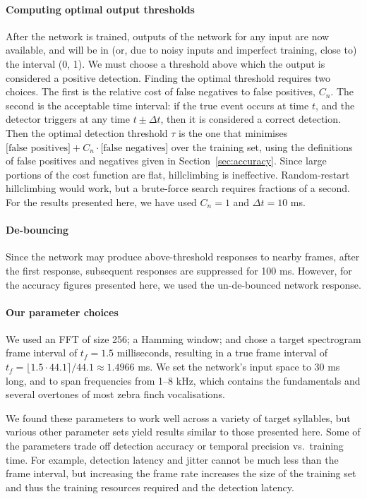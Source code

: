 \documentclass[10pt,letterpaper]{article}
\renewcommand{\subsubsection}[1]{\paragraph{#1}}
\begin{document}
\subsubsection{Computing optimal output thresholds}
\label{sec:optimalthresholds}
After the network is trained, outputs of the network for any input
are now available, and will be in (or, due to noisy inputs and imperfect training, close to) the
interval (0, 1). We must choose a threshold above which the output is
considered a positive detection. Finding the optimal threshold
requires two choices. The first is the relative cost of false
negatives to false positives, $C_n$. The second is the acceptable time
interval: if the true event occurs at time $t$, and the detector
triggers at any time $t\pm\Delta t$, then it is considered a correct
detection. Then the optimal detection threshold $\tau$ is the one that
minimises $\mbox{[false positives]} +C_n\cdot\mbox{[false negatives]}$
over the training set, using the definitions of false positives and
negatives given in Section~\ref{sec:accuracy}. Since large
portions of the cost function are flat, hillclimbing is ineffective.  Random-restart hillclimbing
would work, but a brute-force search requires fractions of a
second. For the results presented here, we have used $C_n=1$ and $\Delta t=10$ ms.

\subsubsection{De-bouncing}

Since the network may produce above-threshold responses to nearby frames, after the first response, subsequent responses are suppressed for 100 ms.  However, for the accuracy figures presented here, we used the un-de-bounced network response.

\subsubsection{Our parameter choices}

We used an FFT of size 256; a Hamming window; and chose a target spectrogram
frame interval of $t_f=1.5$ milliseconds, resulting in a true frame interval of $t_f=\lfloor 1.5\cdot 44.1\rceil /44.1\approx 1.4966$ ms.  We set the network's input
space to 30 ms long, and to span frequencies from 1--8 kHz, which
contains the fundamentals and several overtones of most zebra finch
vocalisations.

We found these parameters to work well across a variety of target
syllables, but various other parameter sets yield results similar to those
presented here.  Some of the parameters trade off detection accuracy
or temporal precision vs.~training time. For example, detection latency
and jitter cannot be much less than the frame interval, but increasing the
frame rate increases the size of the training set and thus the
training resources required and the detection latency.
\end{document}
